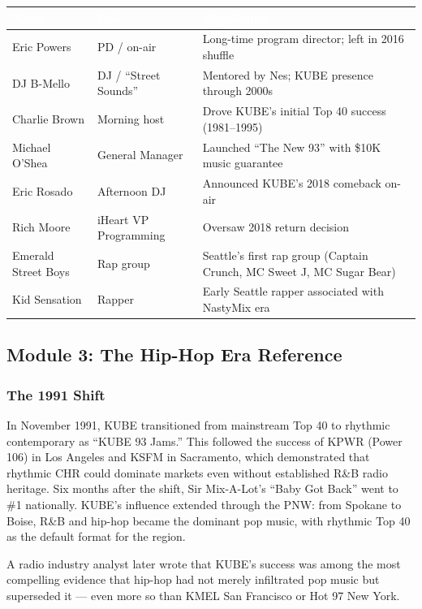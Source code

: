 \documentclass[11pt,letterpaper]{article}
\newcommand{\tableheader}[1]{\textbf{\sffamily\textcolor{white}{#1}}}
\begin{document}
\begin{center}
\begin{tabularx}{\textwidth}{L{3cm}L{2.5cm}X}
\toprule
{}
\tableheader{Name} & \tableheader{Role} & \tableheader{Significance} \\
\midrule
Eric Powers & PD / on-air & Long-time program director; left in 2016 shuffle \\
DJ B-Mello & DJ / ``Street Sounds'' & Mentored by Nes; KUBE presence through 2000s \\
Charlie Brown & Morning host & Drove KUBE's initial Top 40 success (1981--1995) \\
Michael O'Shea & General Manager & Launched ``The New 93'' with \$10K music guarantee \\
Eric Rosado & Afternoon DJ & Announced KUBE's 2018 comeback on-air \\
Rich Moore & iHeart VP Programming & Oversaw 2018 return decision \\
Emerald Street Boys & Rap group & Seattle's first rap group (Captain Crunch, MC Sweet J, MC Sugar Bear) \\
Kid Sensation & Rapper & Early Seattle rapper associated with NastyMix era \\
\bottomrule
\end{tabularx}
\end{center}

\subsection{Module 3: The Hip-Hop Era Reference}

\subsubsection{The 1991 Shift}
In November 1991, KUBE transitioned from mainstream Top 40 to rhythmic contemporary as ``KUBE 93 Jams.'' This followed the success of KPWR (Power 106) in Los Angeles and KSFM in Sacramento, which demonstrated that rhythmic CHR could dominate markets even without established R\&B radio heritage. Six months after the shift, Sir Mix-A-Lot's ``Baby Got Back'' went to \#1 nationally. KUBE's influence extended through the PNW: from Spokane to Boise, R\&B and hip-hop became the dominant pop music, with rhythmic Top 40 as the default format for the region.

A radio industry analyst later wrote that KUBE's success was among the most compelling evidence that hip-hop had not merely infiltrated pop music but superseded it --- even more so than KMEL San Francisco or Hot 97 New York.
\end{document}
